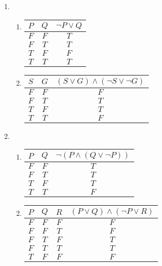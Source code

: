 \begin{enumerate}
    \item
    \begin{enumerate}
        \item
        \begin{tabular}{c | c | c}
            $P$ & $Q$ & $\lnot P \lor Q$ \\
            \hline
            $F$ & $F$ & $T$ \\
            $F$ & $T$ & $T$ \\
            $T$ & $F$ & $F$ \\
            $T$ & $T$ & $T$ 
        \end{tabular}
        \item 
        \begin{tabular}{c | c | c}
            $S$ & $G$ & $(S \lor G) \land (\lnot S \lor \lnot G)$\\
            \hline
            $F$ & $F$ & $F$ \\
            $F$ & $T$ & $T$ \\
            $T$ & $F$ & $T$ \\
            $T$ & $T$ & $F$ 
        \end{tabular}
    \end{enumerate}
    \item
    \begin{enumerate}
        \item
        \begin{tabular}{c | c | c}
            $P$ & $Q$ & $\lnot (P \land (Q \lor \lnot P))$\\
            \hline
            $F$ & $F$ & $T$ \\
            $F$ & $T$ & $T$ \\
            $T$ & $F$ & $T$ \\
            $T$ & $T$ & $F$ 
        \end{tabular}
        \item
        \begin{tabular}{c | c | c | c}
            $P$ & $Q$ & $R$ & $(P \lor Q) \land (\lnot P \lor R)$\\
            \hline
            $F$ & $F$ & $F$ & $F$ \\
            $F$ & $F$ & $T$ & $F$ \\
            $F$ & $T$ & $F$ & $T$ \\
            $F$ & $T$ & $T$ & $T$ \\
            $T$ & $F$ & $F$ & $F$ \\

\end{tabular}
\end{enumerate}
\end{enumerate}
